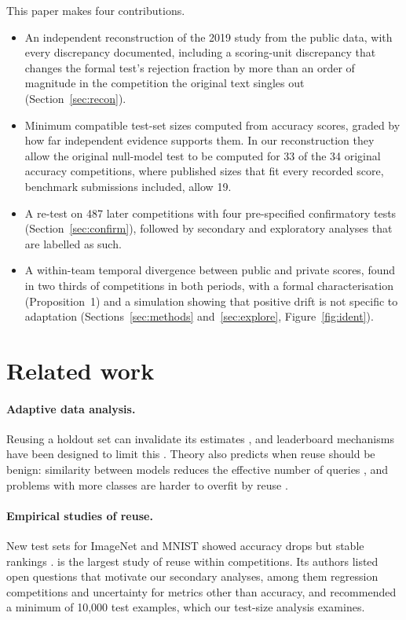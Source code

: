 \documentclass[10pt]{article}
\begin{document}
This paper makes four contributions.
\begin{itemize}
\item An independent reconstruction of the 2019 study from the public data, with every discrepancy documented, including a scoring-unit discrepancy that changes the formal test's rejection fraction by more than an order of magnitude in the competition the original text singles out (Section~\ref{sec:recon}).
\item Minimum compatible test-set sizes computed from accuracy scores, graded by how far independent evidence supports them. In our reconstruction they allow the original null-model test to be computed for 33 of the 34 original accuracy competitions, where published sizes that fit every recorded score, benchmark submissions included, allow 19.
\item A re-test on 487 later competitions with four pre-specified confirmatory tests (Section~\ref{sec:confirm}), followed by secondary and exploratory analyses that are labelled as such.
\item A within-team temporal divergence between public and private scores, found in two thirds of competitions in both periods, with a formal characterisation (Proposition~1) and a simulation showing that positive drift is not specific to adaptation (Sections~\ref{sec:methods} and~\ref{sec:explore}, Figure~\ref{fig:ident}).
\end{itemize}

\section{Related work}

\paragraph{Adaptive data analysis.} Reusing a holdout set can invalidate its estimates \citep{dwork2015reusable}, and leaderboard mechanisms have been designed to limit this \citep{blum2015ladder}. Theory also predicts when reuse should be benign: similarity between models reduces the effective number of queries \citep{mania2019similarity}, and problems with more classes are harder to overfit by reuse \citep{feldman2019multiclass}.

\paragraph{Empirical studies of reuse.} New test sets for ImageNet and MNIST showed accuracy drops but stable rankings \citep{recht2019imagenet,yadav2019cold}. \citet{roelofs2019meta} is the largest study of reuse within competitions. Its authors listed open questions that motivate our secondary analyses, among them regression competitions and uncertainty for metrics other than accuracy, and recommended a minimum of 10,000 test examples, which our test-size analysis examines.
\end{document}
